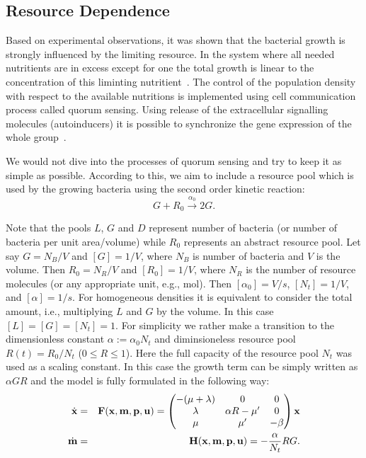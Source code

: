 \documentclass[10pt,A4paper]{article}
\begin{document}
\subsection{Resource Dependence}

Based on experimental observations, it was shown that the bacterial growth is strongly influenced by the limiting resource.
In the system where all needed nutritients are in excess except for one the total growth is linear to the concentration of this liminting nutritient~\cite{hibbing_bacterial_2010, monod_growth_1949}.
The control of the population density with respect to the available nutritions is implemented using cell communication process called quorum sensing. 
Using release of the extracellular signalling molecules (autoinducers) it is possible to synchronize the gene expression of the whole group~\cite{ng_bacterial_2009}.

We would not dive into the processes of quorum sensing and try to keep it as simple as possible.
According to this, we aim to include a resource pool which is used by the growing bacteria using the second order kinetic reaction:
\begin{equation}
    G + R_0  \stackrel{\alpha_0}{\longrightarrow} 2G.
\end{equation}

Note that the pools $L$, $G$ and $D$ represent number of bacteria (or number of bacteria per unit area/volume) while $R_0$ represents an abstract resource pool. 
Let say $G=N_B/V$ and $[G]=1/V$, where $N_B$ is number of bacteria and $V$ is the volume. 
Then $R_0=N_R/V$ and $[R_0]=1/V$, where $N_R$ is the number of resource molecules (or any appropriate unit, e.g., mol). 
Then $[\alpha_0]=V/s$, $[N_t]=1/V$, and $[\alpha]=1/s$. 
For homogeneous densities it is equivalent to consider the total amount, i.e., multiplying $L$ and $G$ by the volume. 
In this case $[L]=[G]=[N_t]=1$.
For simplicity we rather make a transition to the dimensionless constant $\alpha:=\alpha_0 N_t$ and diminsioneless resource pool $R(t) = R_0 / N_t$ ($0 \leqslant R \leqslant 1$).
Here the full capacity of the resource pool $N_t$ was used as a scaling constant.
In this case the growth term can be simply written as $\alpha G R$ and the model is fully formulated in the following way: 
\begin{eqnarray}
    \dot {\mathbf{x}}  &=& \mathbf{F}(\mathbf{x}, \mathbf{m}, \mathbf{p}, \mathbf{u}) = \begin{pmatrix}
                                                    -(\mu + \lambda) & 0               & 0      \\
                                                    \lambda          & \alpha R - \mu' & 0      \\
                                                    \mu              & \mu'            & -\beta 
                                                \end{pmatrix} \mathbf{x}  \\
    \dot {\mathbf{m}} &=& \mathbf{H} (\mathbf{x}, \mathbf{m}, \mathbf{p}, \mathbf{u}) = -\frac{\alpha}{N_t} R G.
\end{eqnarray}
\end{document}
